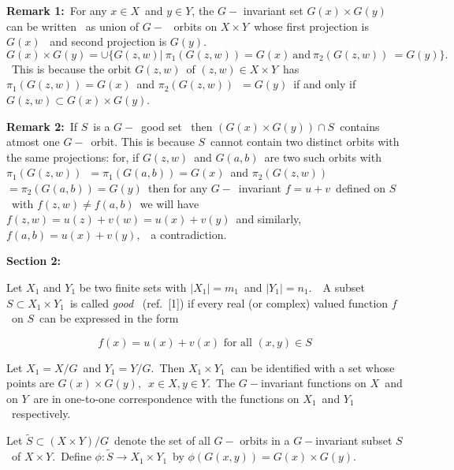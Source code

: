 \documentclass{article}
\begin{document}
{\large \bigskip }

{\large \textbf{Remark 1:}\ For any $x\in X$\ and $y\in Y$, the $G-$%
invariant set }$G(x)\times G(y)$ {\large can be written \ as union of }$G-$%
{\large \ orbits on }$X\times Y${\large \ whose first projection is }$G(x)$%
{\large \ and second projection is $G(y).$ } {\large \
\begin{equation*}
G(x)\times G(y)=\cup \{G(z,w)|\ \pi _{1}(G(z,w)) =G(x)\ \text{and}\ \pi
_{2}(G(z,w))\ =G(y)\}.
\end{equation*}
\ This is because the orbit $G(z,w)$\ of $(z,w)\in X\times Y$\ has $\pi
_{1}(G(z,w))=G(x)$\ and $\pi _{2}(G(z,w))$\ $=G(y)$\ if and only if $%
G(z,w)\subset G(x)\times G(y).$ }

{\large \bigskip }

{\large \textbf{Remark 2:}\ If $S$\ is a $G-$\ good set \ then $(G(x)\times
G(y))\cap S$\ contains atmost one $G-$\ orbit. This is because $S$\ cannot
contain two distinct orbits with the same projections: for, if $G(z,w)$\ and
$G(a,b)$\ are two such orbits with $\pi _{1}(G(z,w))$\ $=\pi
_{1}(G(a,b))=G(x)$\ and $\pi _{2}(G(z,w))$\ $=\pi _{2}(G(a,b))=G(y)$\ then
for any $G-$\ invariant $f=u+v$\ defined on $S$\ with $f(z,w)\neq f(a,b)$\
we will have $f(z,w)=u(z)+v(w)=u(x)+v(y)$\ and similarly, $f(a,b)=u(x)+v(y),$%
\ a contradiction. \bigskip }

{\large \textbf{Section 2: }\ }

{\large \bigskip }

{\large Let $X_{1}$ and $Y_{1}$ be two finite sets with $|X_{1}|=m_{1}$\ and
$|Y_{1}|=n_{1}.$\ \ A subset $S\subset X_{1}\times Y_{1}$\ is called \emph{%
good} \ (ref.\ [1]) if every real (or complex) valued function $f$\ on $S$\
can be expressed in the form }

{\large
\begin{equation*}
f(x)=u(x)+v(x)\text{\ for all }(x,y)\in S
\end{equation*}
}

{\large Let $X_{1}=X/G$\ and $Y_{1}=Y/G.$\ Then $X_{1}\times Y_{1}$\ can be
identified with a set whose points are $G(x)\times G(y),$\ $x\in X,y\in Y.$\
The $G-$invariant functions on $X$\ and on $Y$\ are in one-to-one
correspondence with the functions on $X_{1}$\ and $Y_{1}$\ respectively. }

{\large Let $\widetilde{S}\subset (X\times Y)/G$\ denote the set of all $G-$%
orbits in a $G-$invariant subset $S$\ of $X\times Y.$\ Define $\phi :%
\widetilde{S}\longrightarrow X_{1}\times Y_{1}$\ by $\phi
(G(x,y))=G(x)\times G(y)$. }
\end{document}
